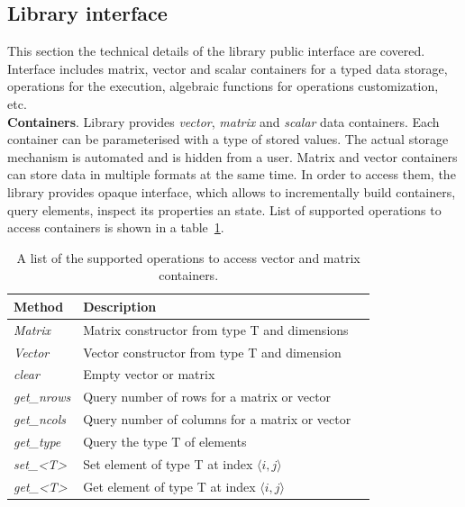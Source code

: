 \subsection{Library interface}

This section the technical details of the library public interface are covered. Interface includes matrix, vector and scalar containers for a typed data storage, operations for the execution, algebraic functions for operations customization, etc.\\

\textbf{Containers}. Library provides \textit{vector}, \textit{matrix} and \textit{scalar} data containers. Each container can be parameterised with a type of stored values. The actual storage mechanism is automated and is hidden from a user. Matrix and vector containers can store data in multiple formats at the same time. In order to access them, the library provides opaque interface, which allows to incrementally build containers, query elements, inspect its properties an state. List of supported operations to access containers is shown in a table~\ref{tab:containers}.\\

\begin{table}[tbp]
\caption{A list of the supported operations to access vector and matrix containers.}
\begin{center}
    \begin{tabular}{|l|l|l|}
    \hline
    \textbf{Method} & \textbf{Description} \\ \hline
    \hline
    \textit{Matrix} & Matrix constructor from type T and dimensions\\ \hline
    \textit{Vector} & Vector constructor from type T and dimension\\ \hline
    \hline
    \textit{clear} & Empty vector or matrix\\ \hline
    \hline
    \textit{get\_nrows} & Query number of rows for a matrix or vector\\ \hline
    \textit{get\_ncols} & Query number of columns for a matrix or vector\\ \hline
    \textit{get\_type} & Query the type T of elements \\ \hline
    \hline
    \textit{set\_<T>} & Set element of type T at index $\langle i,j\rangle$\\ \hline
    \textit{get\_<T>} & Get element of type T at index $\langle i,j\rangle$\\ \hline
    \end{tabular}
    \label{tab:containers}
\end{center}
\end{table}

